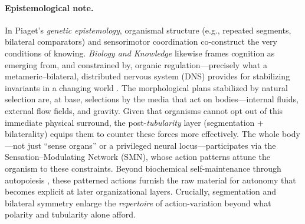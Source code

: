 \paragraph{Epistemological note.}
In Piaget’s \emph{genetic epistemology}, organismal structure (e.g., repeated segments, bilateral comparators) and sensorimotor coordination co-construct the very conditions of knowing. \emph{Biology and Knowledge} likewise frames cognition as emerging from, and constrained by, organic regulation—precisely what a metameric–bilateral, distributed nervous system (DNS) provides for stabilizing invariants in a changing world \citep{Piaget1970GeneticEpistemology,Piaget1971BiologyAndKnowledge}. The morphological plans stabilized by natural selection are, at base, selections by the media that act on bodies—internal fluids, external flow fields, and gravity. Given that organisms cannot opt out of this immediate physical surround, the post-\emph{tubularity} layer (segmentation + bilaterality) equips them to counter these forces more effectively. The whole body—not just “sense organs” or a privileged neural locus—participates via the Sensation–Modulating Network (SMN), whose action patterns attune the organism to these constraints. Beyond biochemical self-maintenance through autopoiesis \citep{MaturanaVarela1980}, these patterned actions furnish the raw material for autonomy that becomes explicit at later organizational layers. Crucially, segmentation and bilateral symmetry enlarge the \emph{repertoire} of action-variation beyond what polarity and tubularity alone afford.
